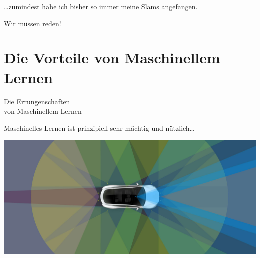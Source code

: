 \documentclass[aspectratio=169,x11names]{beamer}
\begin{document}

\begin{frame}

\begin{center}
\dots zumindest habe ich bisher so immer meine Slams angefangen.
\pause\bigskip

Wir müssen reden!
\end{center}

\end{frame}

\section{Die Vorteile von Maschinellem Lernen}

\begin{frame}
\begin{center}
\huge
Die Errungenschaften\\von Maschinellem Lernen
\end{center}
\end{frame}

\begin{frame}

\begin{center}
Maschinelles Lernen ist prinzipiell sehr mächtig und nützlich\dots
\end{center}

\begin{center}
\includegraphics[width=.9\textwidth]{images/autopilotnew.jpg} 
\end{center}
\end{frame}
\end{document}
